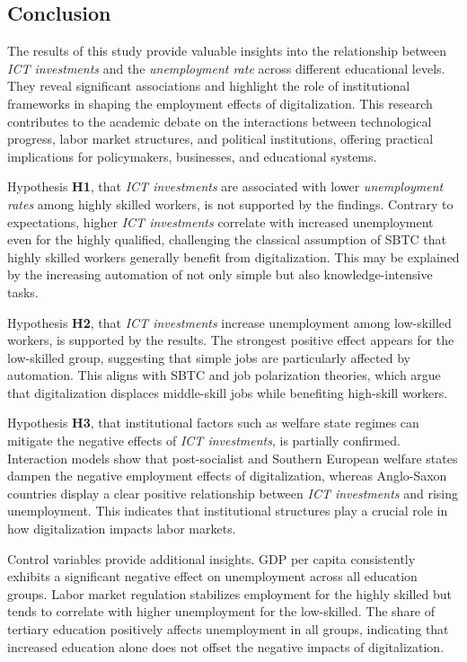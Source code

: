 
\subsection{Conclusion}

The results of this study provide valuable insights into the relationship between 
\textit{ICT investments} and the \textit{unemployment rate} across different educational 
levels. They reveal significant associations and highlight the role of institutional 
frameworks in shaping the employment effects of digitalization. This research contributes 
to the academic debate on the interactions between technological progress, labor market 
structures, and political institutions, offering practical implications for policymakers, 
businesses, and educational systems.

Hypothesis \textbf{H1}, that \textit{ICT investments} are associated with lower 
\textit{unemployment rates} among highly skilled workers, is not supported by the findings. 
Contrary to expectations, higher \textit{ICT investments} correlate with increased 
unemployment even for the highly qualified, challenging the classical assumption of 
\ac{SBTC} that highly skilled workers generally benefit from digitalization. This may be 
explained by the increasing automation of not only simple but also knowledge-intensive tasks.

Hypothesis \textbf{H2}, that \textit{ICT investments} increase unemployment among 
low-skilled workers, is supported by the results. The strongest positive effect appears 
for the low-skilled group, suggesting that simple jobs are particularly affected by automation. 
This aligns with \ac{SBTC} and job polarization theories, which argue that digitalization 
displaces middle-skill jobs while benefiting high-skill workers.

Hypothesis \textbf{H3}, that institutional factors such as welfare state regimes can mitigate 
the negative effects of \textit{ICT investments}, is partially confirmed. Interaction models 
show that post-socialist and Southern European welfare states dampen the negative employment 
effects of digitalization, whereas Anglo-Saxon countries display a clear positive relationship 
between \textit{ICT investments} and rising unemployment. This indicates that institutional 
structures play a crucial role in how digitalization impacts labor markets.

Control variables provide additional insights. GDP per capita consistently exhibits a 
significant negative effect on unemployment across all education groups. Labor market 
regulation stabilizes employment for the highly skilled but tends to correlate with higher 
unemployment for the low-skilled. The share of tertiary education positively affects 
unemployment in all groups, indicating that increased education alone does not offset 
the negative impacts of digitalization.

